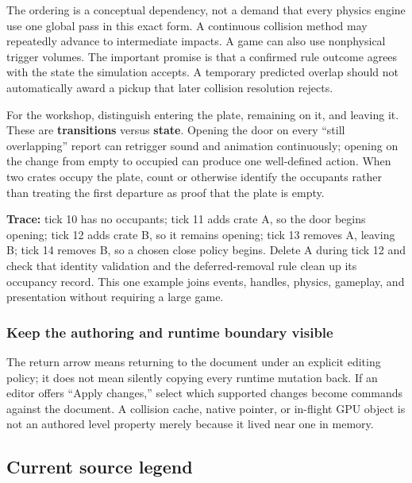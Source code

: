 The ordering is a conceptual dependency, not a demand that every physics engine use one global pass in this exact form. A continuous collision method may repeatedly advance to intermediate impacts. A game can also use nonphysical trigger volumes. The important promise is that a confirmed rule outcome agrees with the state the simulation accepts. A temporary predicted overlap should not automatically award a pickup that later collision resolution rejects.

For the workshop, distinguish entering the plate, remaining on it, and leaving it. These are \textbf{transitions} versus \textbf{state}. Opening the door on every ``still overlapping'' report can retrigger sound and animation continuously; opening on the change from empty to occupied can produce one well-defined action. When two crates occupy the plate, count or otherwise identify the occupants rather than treating the first departure as proof that the plate is empty.

\textbf{Trace:} tick 10 has no occupants; tick 11 adds crate A, so the door begins opening; tick 12 adds crate B, so it remains opening; tick 13 removes A, leaving B; tick 14 removes B, so a chosen close policy begins. Delete A during tick 12 and check that identity validation and the deferred-removal rule clean up its occupancy record. This one example joins events, handles, physics, gameplay, and presentation without requiring a large game.

\subsubsection{Keep the authoring and runtime boundary visible}\label{06-engine-ii-ch042-keep-the-authoring-and-runtime-boundary-visible}

\hypertarget{06-engine-ii-ch042-keep-the-authoring-and-runtime-boundary-visible}{}


The return arrow means returning to the document under an explicit editing policy; it does not mean silently copying every runtime mutation back. If an editor offers ``Apply changes,'' select which supported changes become commands against the document. A collision cache, native pointer, or in-flight GPU object is not an authored level property merely because it lived near one in memory.

\subsection{Current source legend}\label{06-engine-ii-ch042-current-source-legend}

